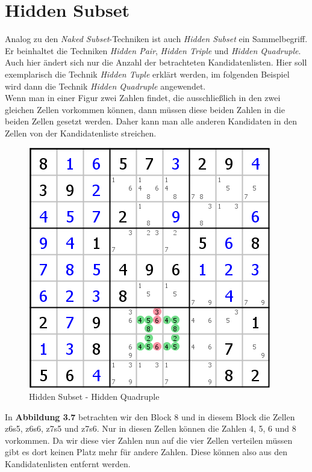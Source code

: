 \newpage
\section{Hidden Subset}
Analog zu den \textit{Naked Subset}-Techniken ist auch \textit{Hidden Subset} ein Sammelbegriff. Er beinhaltet die Techniken \textit{Hidden Pair}, \textit{Hidden Triple} und \textit{Hidden Quadruple}. Auch hier ändert sich nur die Anzahl der betrachteten Kandidatenlisten. Hier soll exemplarisch die Technik \textit{Hidden Tuple} erklärt werden, im folgenden Beispiel wird dann die Technik \textit{Hidden Quadruple} angewendet.\\
Wenn man in einer Figur zwei Zahlen findet, die ausschließlich in den zwei gleichen Zellen vorkommen können, dann müssen diese beiden Zahlen in die beiden Zellen gesetzt werden. Daher kann man alle anderen Kandidaten in den Zellen von der Kandidatenliste streichen.

\begin{figure}[h]
\begin{center}
\includegraphics{./img/hidden_subset.png}
\caption{Hidden Subset - Hidden Quadruple}
\end{center}
\end{figure}

In \textbf{Abbildung 3.7} betrachten wir den Block 8 und in diesem Block die Zellen z6s5, z6s6, z7s5 und z7s6. Nur in diesen Zellen können die Zahlen 4, 5, 6 und 8 vorkommen. Da wir diese vier Zahlen nun auf die vier Zellen verteilen müssen gibt es dort keinen Platz mehr für andere Zahlen. Diese können also aus den Kandidatenlisten entfernt werden.
